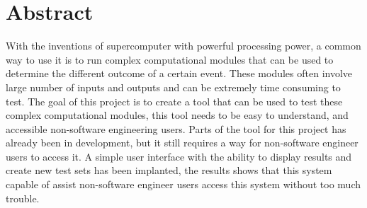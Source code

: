 \chapter*{\Large \center Abstract}

With the inventions of supercomputer with powerful processing power, a common way to use it is to run complex computational modules that can be used to determine the different outcome of a certain event. These modules often involve large number of inputs and outputs and can be extremely time consuming to test.
The goal of this project is to create a tool that can be used to test these complex computational modules, this tool needs to be easy to understand, and accessible non-software engineering users. 
Parts of the tool for this project has already been in development, but it still requires a way for non-software engineer users to access it. A simple user interface with the ability to display results and create new test sets has been implanted, the results shows that this system capable of assist non-software engineer users access this system without too much trouble.
